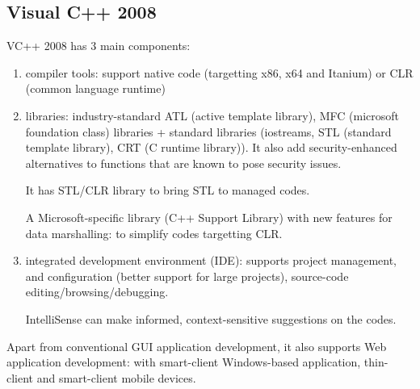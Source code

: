 \subsection{Visual C++ 2008}
\label{sec:VS_2008}

VC++ 2008 has 3 main components:
\begin{enumerate}
  \item compiler tools: support native code (targetting x86, x64 and Itanium) or
  CLR (common language runtime)
  \item libraries: industry-standard ATL (active template library), MFC
  (microsoft foundation class) libraries + standard libraries (iostreams, STL
  (standard template library), CRT (C runtime library)). It also add 
  security-enhanced alternatives to functions that are known to pose security
  issues.
  
  It has STL/CLR library to bring STL to managed codes. 
  
  A Microsoft-specific library (C++ Support Library) with new features for data
  marshalling: to simplify codes targetting CLR.
  
  \item integrated development environment (IDE): supports project management,
  and configuration (better support for large projects), source-code
  editing/browsing/debugging. 
  
  IntelliSense can make informed, context-sensitive suggestions on the codes.
  
\end{enumerate}
Apart from conventional GUI application development, it also supports Web
application development: with smart-client Windows-based application,
thin-client and smart-client mobile devices.

